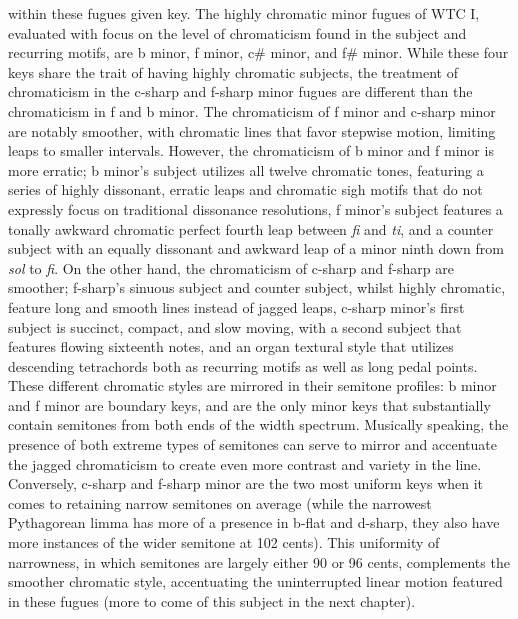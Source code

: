 \begin{itemize}
  within these fugues given key. The highly chromatic minor fugues of
  WTC I, evaluated with focus on the level of chromaticism found in the
  subject and recurring motifs, are b minor, f minor, c\# minor, and f\#
  minor. While these four keys share the trait of having highly
  chromatic subjects, the treatment of chromaticism in the c-sharp and
  f-sharp minor fugues are different than the chromaticism in f and b
  minor. The chromaticism of f minor and c-sharp minor are notably
  smoother, with chromatic lines that favor stepwise motion, limiting
  leaps to smaller intervals. However, the chromaticism of b minor and f
  minor is more erratic; b minor's subject utilizes all twelve chromatic
  tones, featuring a series of highly dissonant, erratic leaps and
  chromatic sigh motifs that do not expressly focus on traditional
  dissonance resolutions, f minor's subject features a tonally awkward
  chromatic perfect fourth leap between \emph{fi} and \emph{ti}, and a
  counter subject with an equally dissonant and awkward leap of a minor
  ninth down from \emph{sol} to \emph{fi}. On the other hand, the
  chromaticism of c-sharp and f-sharp are smoother; f-sharp's sinuous
  subject and counter subject, whilst highly chromatic, feature long and
  smooth lines instead of jagged leaps, c-sharp minor's first subject is
  succinct, compact, and slow moving, with a second subject that
  features flowing sixteenth notes, and an organ textural style that
  utilizes descending tetrachords both as recurring motifs as well as
  long pedal points. These different chromatic styles are mirrored in
  their semitone profiles: b minor and f minor are boundary keys, and
  are the only minor keys that substantially contain semitones from both
  ends of the width spectrum. Musically speaking, the presence of both
  extreme types of semitones can serve to mirror and accentuate the
  jagged chromaticism to create even more contrast and variety in the
  line. Conversely, c-sharp and f-sharp minor are the two most uniform
  keys when it comes to retaining narrow semitones on average (while the
  narrowest Pythagorean limma has more of a presence in b-flat and
  d-sharp, they also have more instances of the wider semitone at 102
  cents). This uniformity of narrowness, in which semitones are largely
  either 90 or 96 cents, complements the smoother chromatic style,
  accentuating the uninterrupted linear motion featured in these fugues
  (more to come of this subject in the next chapter).
\end{itemize}

